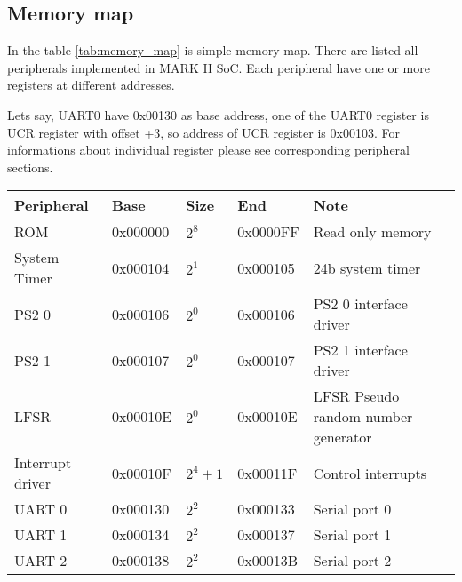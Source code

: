 \subsection{Memory map}

In the table \ref{tab:memory_map} is simple memory map. There are listed all
peripherals implemented in MARK II SoC. Each peripheral have one or more registers at different
addresses.

Lets say, UART0 have 0x00130 as base address, one of the UART0 register
is UCR register with offset +3, so address of UCR register is 0x00103. For
informations about individual register please see corresponding peripheral sections.

\begin{table}[h]
    \centering
    \begin{tabular}{|l|l|l|l|l|}
        \hline
        \textbf{Peripheral} & \textbf{Base} & \textbf{Size} & \textbf{End} & \textbf{Note}                                  \\ \hline
        ROM                 & 0x000000      & $2^{8}$       & 0x0000FF     & Read only memory                               \\ \hline
        System Timer        & 0x000104      & $2^{1}$       & 0x000105     & 24b system timer                               \\ \hline
        PS2 0               & 0x000106      & $2^{0}$       & 0x000106     & PS2 0 interface driver                         \\ \hline
        PS2 1               & 0x000107      & $2^{0}$       & 0x000107     & PS2 1 interface driver                         \\ \hline
        LFSR                & 0x00010E      & $2^{0}$       & 0x00010E     & LFSR Pseudo random number generator            \\ \hline
        Interrupt driver    & 0x00010F      & $2^{4} + 1$   & 0x00011F     & Control interrupts                             \\ \hline
        UART 0              & 0x000130      & $2^{2}$       & 0x000133     & Serial port 0                                  \\ \hline
        UART 1              & 0x000134      & $2^{2}$       & 0x000137     & Serial port 1                                  \\ \hline
        UART 2              & 0x000138      & $2^{2}$       & 0x00013B     & Serial port 2                                  \\ \hline

\end{tabular}
\end{table}

